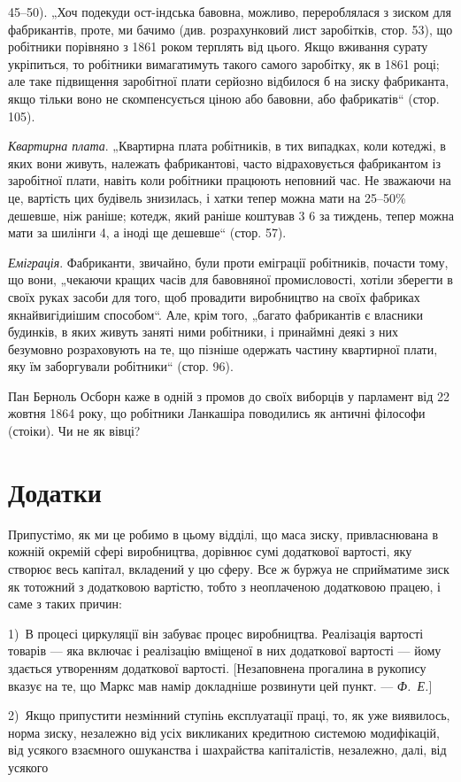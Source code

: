 \parcont{}  %
45--50). „Хоч подекуди ост-індська бавовна, можливо, перероблялася
з зиском для фабрикантів, проте, ми бачимо (див. розрахунковий
лист заробітків, стор. 53), що робітники порівняно
з 1861 роком терплять від цього. Якщо вживання сурату укріпиться,
то робітники вимагатимуть такого самого заробітку, як
в 1861 році; але таке підвищення заробітної плати серйозно
відбилося б на зиску фабриканта, якщо тільки воно не скомпенсується
ціною або бавовни, або фабрикатів“ (стор. 105).

\emph{Квартирна плата}. „Квартирна плата робітників, в тих випадках,
коли котеджі, в яких вони живуть, належать фабрикантові,
часто відраховується фабрикантом із заробітної плати,
навіть коли робітники працюють неповний час. Не зважаючи
на це, вартість цих будівель знизилась, і хатки тепер можна
мати на 25--50\% дешевше, ніж раніше; котедж, який раніше
коштував 3 6 за тиждень, тепер можна мати за шилінги 4, а іноді ще дешевше“ (стор. 57).

\emph{Еміграція}. Фабриканти, звичайно, були проти еміграції робітників,
почасти тому, що вони, „чекаючи кращих часів для бавовняної
промисловості, хотіли зберегти в своїх руках засоби
для того, щоб провадити виробництво на своїх фабриках якнайвигідиішим
способом“. Але, крім того, „багато фабрикантів
є власники будинків, в яких живуть заняті ними робітники,
і принаймні деякі з них безумовно розраховують на те, що
пізніше одержать частину квартирної плати, яку їм заборгували
робітники“ (стор. 96).

Пан Берноль Осборн каже в одній з промов до своїх виборців
у парламент від 22 жовтня 1864 року, що робітники
Ланкашіра поводились як античні філософи (стоіки). Чи не як вівці?

\section{Додатки}

Припустімо, як ми це робимо в цьому відділі, що маса
зиску, привласнювана в кожній окремій сфері виробництва, дорівнює
сумі додаткової вартості, яку створює весь капітал, вкладений
у цю сферу. Все ж буржуа не сприйматиме зиск як тотожний
з додатковою вартістю, тобто з неоплаченою додатковою
працею, і саме з таких причин:

1)~В процесі циркуляції він забуває процес виробництва.
Реалізація вартості товарів — яка включає і реалізацію вміщеної
в них додаткової вартості — йому здається утворенням додаткової
вартості. [Незаповнена прогалина в рукопису вказує на те,
що Маркс мав намір докладніше розвинути цей пункт. — \emph{Ф.~Е.}]

2)~Якщо припустити незмінний ступінь експлуатації праці, то,
як уже виявилось, норма зиску, незалежно від усіх викликаних
кредитною системою модифікацій, від усякого взаємного ошуканства
і шахрайства капіталістів, незалежно, далі, від усякого
\parbreak{}  %
